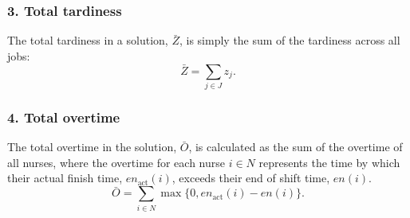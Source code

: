 \documentclass[a4paper,11pt,authoryear]{elsarticle}
\begin{document}
\subsubsection*{3. Total tardiness}
\noindent The total tardiness in a solution, $\bar{Z}$, is simply the sum of the tardiness across all jobs:
\begin{equation}
    \bar{Z} = \sum_{j \in J} z_j. \label{eq:totaltardiness}
\end{equation}

\subsubsection*{4. Total overtime}
\noindent The total overtime in the solution, $\bar{O}$, is calculated as the sum of the overtime of all nurses, where the overtime for each nurse $i \in N$ represents the time by which their actual finish time, $en_{\text{act}}(i)$, exceeds their end of shift time, $en(i)$. 
\begin{equation}
     \bar{O} = \sum_{i \in N} \max \{0, en_{\text{act}}(i) - en(i)\}. \label{eq:totalovertime}
\end{equation}


\end{document}
